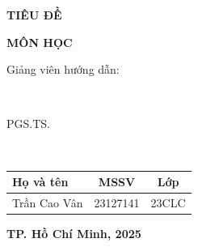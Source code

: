 \begin{titlepage}
\begin{center}
    \vspace{15pt}
    \textbf{TIÊU ĐỀ}
\end{center}
\begin{center}
    \vspace{5pt}
    \fontsize{16pt}{15pt}\selectfont
    \textbf{\textrm{MÔN HỌC}}
\end{center}

\vspace{2pt}
\begin{center}
\begin{bfseries}Giảng viên hướng dẫn: \end{bfseries}\\
\begin{bfseries}PGS.TS.\end{bfseries}\\

\end{center}

\vspace{10pt}

\begin{center}
\begin{tabular}{l c c}
\textbf{Họ và tên} & \textbf{MSSV} & \textbf{Lớp} \\
\hline
Trần Cao Vân        & 23127141 & 23CLC \\
\end{tabular}
\end{center}

\vspace{6pt}
\begin{center}
    \textbf{TP. Hồ Chí Minh, 2025}
\end{center}
\end{titlepage}
